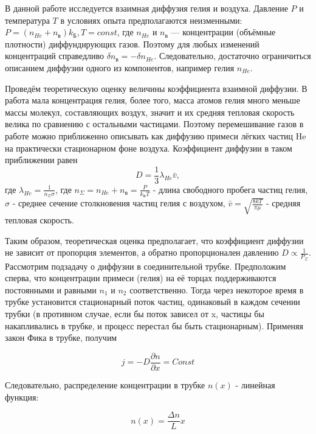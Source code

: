 \documentclass[12pt,a4paper]{article}
\begin{document}
В данной работе исследуется взаимная диффузия гелия и воздуха. Давление $P$ и температура $T$ в условиях опыта предполагаются неизменными:
$P = (n_{He}+n_{в})k_{Б},
T = const$, где $n_{He}$ и $n_{в}$
 — концентрации (объёмные плотности) диффундирующих газов. Поэтому для любых изменений концентраций справедливо $\delta n_{в}=−\delta n_{He}$. Следовательно, достаточно ограничиться описанием диффузии одного из компонентов, например гелия $n_{He}$.

Проведём теоретическую оценку величины коэффициента взаимной диффузии. В работа мала концентрация гелия, более того,  масса атомов гелия много меньше массы молекул, составляющих воздух, значит и их средняя тепловая скорость велика по сравнению с остальными частицами. Поэтому перемешивание газов в работе можно приближенно описывать как диффузию примеси лёгких частиц He на практически стационарном фоне воздуха. Коэффициент диффузии в таком приближении равен 
\begin{equation}
    D = \frac{1}{3}\lambda_{He} \bar v,
\label{eq:D}
\end{equation}
где $\lambda_{He} = \frac{1}{n_{\Sigma} \sigma}$, где $n_{\Sigma} = n_{He} + n_{в} = \frac{P}{k_{Б} T}$ - длина свободного пробега частиц гелия,  $\sigma$ -  среднее сечение столкновения частиц гелия с воздухом,  $\bar v = \sqrt{\frac{8kT}{\pi \mu}}$ - средняя тепловая скорость. 

Таким образом, теоретическая оценка предполагает, что коэффициент диффузии не зависит от пропорция элементов, а обратно пропорционален давлению $D \propto \frac{1}{P_\Sigma}$.\\

Рассмотрим подзадачу о диффузии в соединительной
трубке. Предположим сперва, что концентрации примеси
(гелия) на её торцах поддерживаются постоянными и
равными $n_{1}$ и $n_{2}$ соответственно. Тогда через некоторое время в трубке установится стационарный поток частиц, одинаковый в каждом сечении трубки (в противном случае, если бы поток зависел от x, частицы бы накапливались в трубке, и процесс перестал бы быть стационарным). Применяя закон Фика в трубке, получим

\begin{equation}
j = - D \frac{\partial n}{\partial x} = Const
\end{equation}

Следовательно,  распределение концентрации в трубке $n(x)$ - линейная функция:

\begin{equation}
n(x) = \frac{\Delta n}{L}x
\end{equation}
\end{document}
